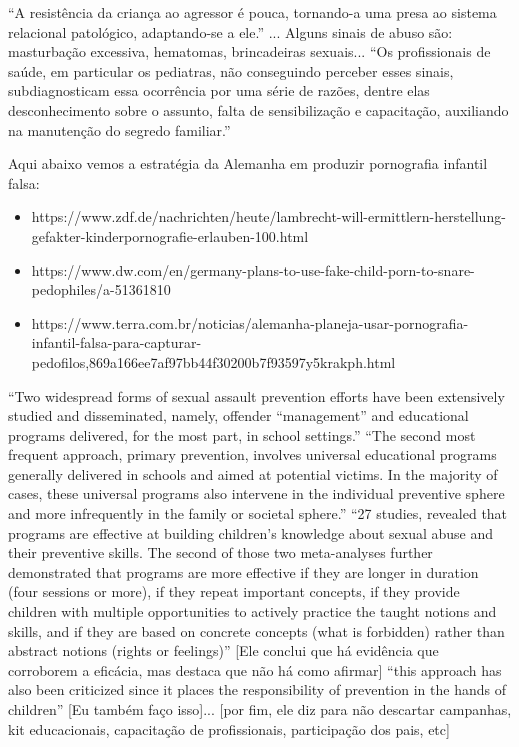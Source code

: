 ``A resistência da criança ao agressor é pouca, tornando-a uma presa ao sistema relacional patológico, adaptando-se a ele.'' ... Alguns sinais de abuso são: masturbação excessiva, hematomas, brincadeiras sexuais... ``Os profissionais de saúde, em particular os pediatras, não conseguindo perceber esses sinais, subdiagnosticam essa ocorrência por uma série de razões, dentre elas desconhecimento sobre o assunto, falta de sensibilização e capacitação, auxiliando na manutenção do segredo familiar.'' \cite{pavao2013impasse}


Aqui abaixo vemos a estratégia da Alemanha em produzir pornografia infantil falsa:
\begin{itemize}
  \item https://www.zdf.de/nachrichten/heute/lambrecht-will-ermittlern-herstellung-gefakter-kinderpornografie-erlauben-100.html

  \item https://www.dw.com/en/germany-plans-to-use-fake-child-porn-to-snare-pedophiles/a-51361810

  \item https://www.terra.com.br/noticias/alemanha-planeja-usar-pornografia-infantil-falsa-para-capturar-pedofilos,869a166ee7af97bb44f30200b7f93597y5krakph.html
\end{itemize}

``Two widespread forms of sexual assault prevention efforts have been extensively studied and disseminated, namely, offender “management” and educational programs delivered, for the most part, in school settings.''
``The second most frequent approach, primary prevention, involves universal educational programs generally delivered in schools and aimed at potential victims. In the majority of cases, these universal programs also intervene in the individual preventive sphere and more infrequently in the family or societal sphere.''
``27 studies, revealed that programs are effective at building children’s  knowledge about sexual abuse and their preventive skills. The second of those two meta-analyses further demonstrated that programs are more effective if they are longer in duration (four sessions or more), if they repeat important concepts, if they provide children with multiple opportunities to actively practice the taught notions and skills, and if they are based on concrete concepts (what is forbidden) rather than abstract notions (rights or feelings)'' [Ele conclui que há evidência que corroborem a eficácia, mas destaca que não há como afirmar] ``this approach has also been criticized since it places the responsibility of prevention in the hands of children'' [Eu também faço isso]... [por fim, ele diz para não descartar campanhas, kit educacionais, capacitação de profissionais, participação dos pais, etc] \cite{collin2013lessons}



